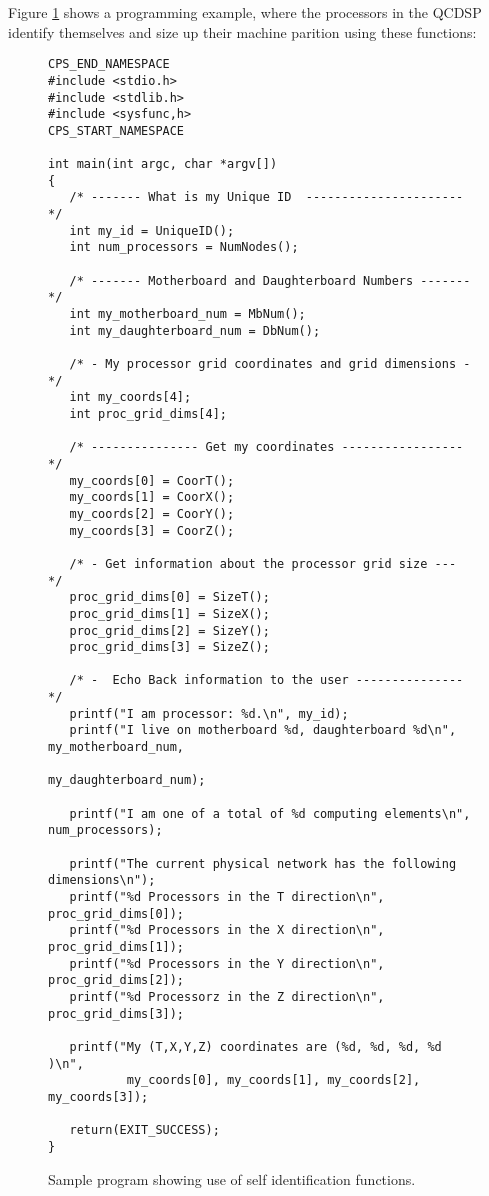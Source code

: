 Figure \ref{f:whoamiCode} shows a programming example, where the processors
in the QCDSP identify themselves and size up their machine parition using
these functions:
\begin{figure}[h]
\tiny
\begin{verbatim}
CPS_END_NAMESPACE
#include <stdio.h>
#include <stdlib.h>
#include <sysfunc,h>
CPS_START_NAMESPACE

int main(int argc, char *argv[])
{
   /* ------- What is my Unique ID  ---------------------- */
   int my_id = UniqueID();
   int num_processors = NumNodes();

   /* ------- Motherboard and Daughterboard Numbers -------*/
   int my_motherboard_num = MbNum();
   int my_daughterboard_num = DbNum();

   /* - My processor grid coordinates and grid dimensions -*/
   int my_coords[4];
   int proc_grid_dims[4];

   /* --------------- Get my coordinates ----------------- */
   my_coords[0] = CoorT();
   my_coords[1] = CoorX();
   my_coords[2] = CoorY();
   my_coords[3] = CoorZ();

   /* - Get information about the processor grid size ---  */
   proc_grid_dims[0] = SizeT();
   proc_grid_dims[1] = SizeX();
   proc_grid_dims[2] = SizeY();
   proc_grid_dims[3] = SizeZ();

   /* -  Echo Back information to the user --------------- */
   printf("I am processor: %d.\n", my_id);
   printf("I live on motherboard %d, daughterboard %d\n",  my_motherboard_num,
                                                             my_daughterboard_num);

   printf("I am one of a total of %d computing elements\n", num_processors);
  
   printf("The current physical network has the following dimensions\n");
   printf("%d Processors in the T direction\n", proc_grid_dims[0]);
   printf("%d Processors in the X direction\n", proc_grid_dims[1]);
   printf("%d Processors in the Y direction\n", proc_grid_dims[2]);
   printf("%d Processorz in the Z direction\n", proc_grid_dims[3]);
  
   printf("My (T,X,Y,Z) coordinates are (%d, %d, %d, %d )\n", 
           my_coords[0], my_coords[1], my_coords[2], my_coords[3]);

   return(EXIT_SUCCESS);
}
\end{verbatim}
\caption{Sample program showing use of self identification functions.}
\label{f:whoamiCode}
\end{figure}   

